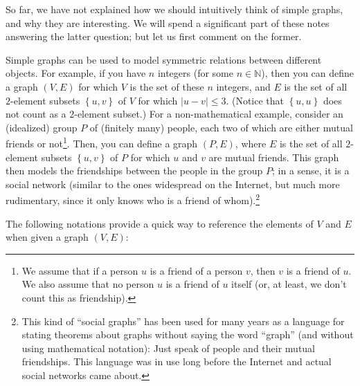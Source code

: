 \documentclass[numbers=enddot,12pt,final,onecolumn,notitlepage]{scrartcl}%
\theoremstyle{definition}
\newcommand{\NN}{\mathbb{N}}
\newcommand{\set}[1]{\left\{ #1 \right\}}
\newcommand{\abs}[1]{\left| #1 \right|}
\newcommand{\tup}[1]{\left( #1 \right)}
\begin{document}
So far, we have not explained how we should intuitively think of
simple graphs, and why they are interesting. We will spend a
significant part of these notes answering the latter question; but let
us first comment on the former.

Simple graphs can be used to model symmetric relations between
different objects. For example, if you have $n$ integers
(for some $n \in \NN$), then you can define a graph
$\tup{V, E}$ for which $V$ is the set of these $n$ integers,
and $E$ is the set of all $2$-element subsets
$\set{u, v}$ of $V$ for which $\abs{u-v} \leq 3$. (Notice that
$\set{u, u}$ does not count as a $2$-element subset.)
For a non-mathematical example, consider an (idealized) group $P$ of
(finitely many) people, each two of which are either mutual friends or
not\footnote{We assume that if a person $u$ is a friend of a person
$v$, then $v$ is a friend of $u$. We also assume that no person $u$ is
a friend of $u$ itself (or, at least, we don't count this as
friendship).}. Then, you can define a graph $\tup{P, E}$, where $E$
is the set of all $2$-element subsets $\set{u, v}$ of $P$ for which
$u$ and $v$ are mutual friends. This graph then models the friendships
between the people in the group $P$; in a sense, it is a social
network (similar to the ones widespread on the Internet, but much more
rudimentary, since it only knows who is a friend of
whom).\footnote{This kind of ``social graphs'' has been used for many
years as a language for stating theorems about graphs without saying
the word ``graph'' (and without using mathematical notation): Just
speak of people and their mutual friendships. This language was in use
long before the Internet and actual social networks came about.}

The following notations provide a quick way to reference the elements
of $V$ and $E$ when given a graph $\tup{V, E}$:
\end{document}
